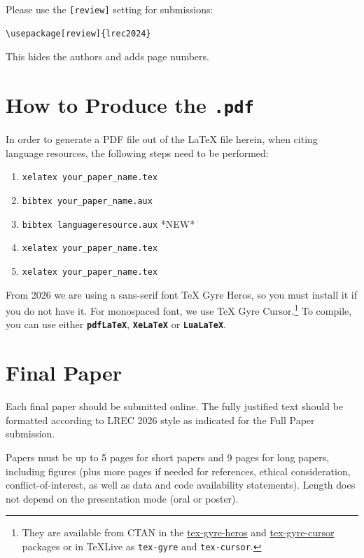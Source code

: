 \documentclass[10pt, a4paper]{article}
\begin{document}
Please use the \texttt{[review]} setting for submissions:

\begin{verbatim}
\usepackage[review]{lrec2024}
\end{verbatim}

This hides the authors and adds page numbers.

\section{How to Produce the \texttt{.pdf}}
\label{sec:append-how-prod}


In order to generate a PDF file out of the LaTeX file herein, when citing language resources, the following steps need to be performed:

\begin{enumerate}
\item \texttt{xelatex your\_paper\_name.tex}
\item \texttt{bibtex your\_paper\_name.aux}
\item \texttt{bibtex languageresource.aux}    *NEW*
\item \texttt{xelatex your\_paper\_name.tex}
\item \texttt{xelatex your\_paper\_name.tex}
\end{enumerate}

From 2026 we are using a sans-serif font TeX Gyre Heros, so you must
install it if you do not have it.  For monospaced font, we use TeX
Gyre Cursor.\footnote{They are available from CTAN in the
  \href{https://ctan.org/pkg/tex-gyre-heros}{tex-gyre-heros} and
  \href{https://ctan.org/pkg/tex-gyre-cursor}{tex-gyre-cursor} packages
    or in TeXLive as \texttt{tex-gyre} and \texttt{tex-cursor}.}  To
  compile, you can use either \textbf{\texttt{pdfLaTeX}},
  \textbf{\texttt{XeLaTeX}} or \textbf{\texttt{LuaLaTeX}}.

\section{Final Paper}

Each final paper should be submitted online. The fully justified text should be formatted according to LREC 2026 style as indicated for the Full Paper submission.

Papers must be up to 5 pages for short papers and 9 pages for long
papers, including figures (plus more pages if needed for references,
ethical consideration, conflict-of-interest, as well as data and code
availability statements).  Length does not depend on the presentation
mode (oral or poster).
\end{document}
